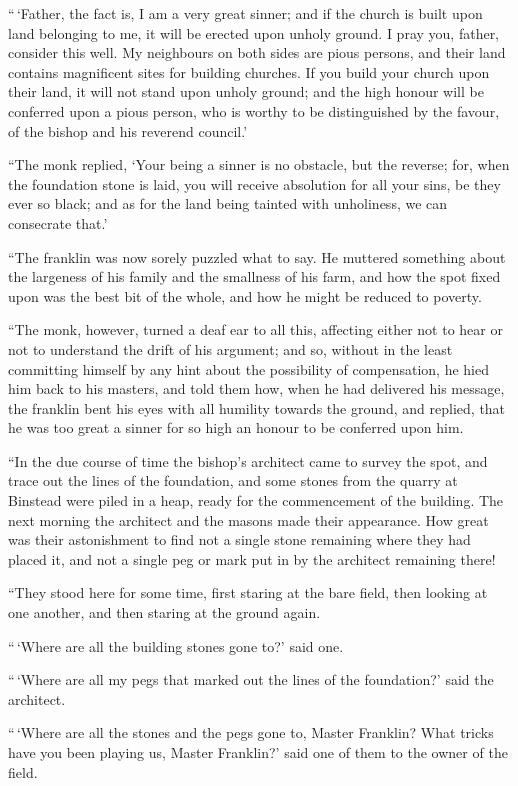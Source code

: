 \documentclass[
  12pt,
  a5paper,
  twoside]{book}
\begin{document}
``\,`Father, the fact is, I am a very great sinner; and if the church is
built upon land belonging to me, it will be erected upon unholy ground.
I pray you, father, consider this well. My neighbours on both sides are
pious persons, and their land contains magnificent sites for building
churches. If you build your church upon their land, it will not stand
upon unholy ground; and the high honour will be conferred upon a pious
person, who is worthy to be distinguished by the favour, of the bishop
and his reverend council.'

``The monk replied, `Your being a sinner is no obstacle, but the
reverse; for, when the foundation stone is laid, you will receive
absolution for all your sins, be they ever so black; and as for the land
being tainted with unholiness, we can consecrate that.'

``The franklin was now sorely puzzled what to say. He muttered something
about the largeness of his family and the smallness of his farm, and how
the spot fixed upon was the best bit of the whole, and how he might be
reduced to poverty.

``The monk, however, turned a deaf ear to all this, affecting either not
to hear or not to understand the drift of his argument; and so, without
in the least committing himself by any hint about the possibility of
compensation, he hied him back to his masters, and told them how, when
he had delivered his message, the franklin bent his eyes with all
humility towards the ground, and replied, that he was too great a sinner
for so high an honour to be conferred upon him.

``In the due course of time the bishop's architect came to survey the
spot, and trace out the lines of the foundation, and some stones from
the quarry at Binstead were piled in a heap, ready for the commencement
of the building. The next morning the architect and the masons made
their appearance. How great was their astonishment to find not a single
stone remaining where they had placed it, and not a single peg or mark
put in by the architect remaining there!

``They stood here for some time, first staring at the bare field, then
looking at one another, and then staring at the ground again.

``\,`Where are all the building stones gone to?' said one.

``\,`Where are all my pegs that marked out the lines of the foundation?'
said the architect.

``\,`Where are all the stones and the pegs gone to, Master Franklin?
What tricks have you been playing us, Master Franklin?' said one of them
to the owner of the field.
\end{document}
